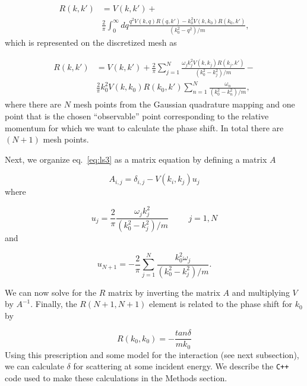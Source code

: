 \documentclass[10pt,showpacs,preprintnumbers,footinbib,amsmath,amssymb,aps,prl,twocolumn,groupedaddress,superscriptaddress,showkeys]{revtex4-1}
\begin{document}
\begin{equation}
\begin{split}
    R(k,k') &= V(k,k') + \\
   & \frac{2}{\pi}
                \int_0^{\infty}dq
                \frac{q^2V(k,q)R(q,k')-k_0^2V(k,k_0)R(k_0,k')  }
                     {(k_0^2-q^2)/m},
   \label{eq:ls2}
\end{split}
\end{equation}
which is represented on the discretized mesh as

\begin{equation}
\begin{split}
R(k,k') &= V(k,k') +\frac{2}{\pi}\sum_{j=1}^N\frac{\omega_jk_j^2V(k,k_j)R(k_j,k')}{(k_0^2-k_j^2)/m}- \\
  & \frac{2}{\pi}k_0^2V(k,k_0)R(k_0,k')\sum_{n=1}^N\frac{\omega_n}{(k_0^2-k_n^2)/m},
\end{split}
\label{eq:ls3}
\end{equation}
where there are $N$ mesh points from the Gaussian quadrature mapping
and one point that is the chosen ``observable'' point corresponding to the
relative momentum for which we want to calculate the phase shift. In total
there are $(N+1)$ mesh points.

Next, we organize eq.~\ref{eq:ls3} as a matrix equation by defining a
matrix $A$

\begin{equation*}
	A_{i,j} = \delta _{i,j} - V(k_i,k_j)u_j
\end{equation*}
where

\begin{equation}
     u_j=\frac{2}{\pi}
         \frac{\omega_jk_j^2}{(k_0^2-k_j^2)/m}\hspace{1cm}
         j=1,N
\label{eq:uj}
\end{equation}
and

\begin{equation}
     u_{N+1}=-\frac{2}{\pi}
          \sum_{j=1}^N\frac{k_0^2\omega_j}{(k_0^2-k_j^2)/m}.
\label{eq:u0}
\end{equation}

We can now solve for the $R$ matrix by inverting the matrix $A$ and multiplying $V$
by $A^{-1}$. Finally, the $R(N+1,N+1)$ element is related to the phase
shift for $k_0$ by

\begin{equation}
	R(k_0,k_0)=-\frac{tan\delta}{mk_0}
	\label{eq:PhaseShift}
\end{equation}
Using this prescription and some model for the interaction (see next
subsection), we can calculate $\delta$ for scattering at some incident energy.
We describe the \texttt{C++} code used to make these calculations in
the Methods section.
\end{document}
